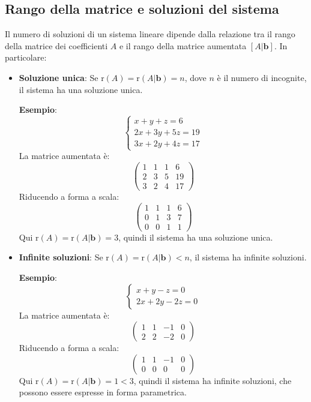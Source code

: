 \documentclass{article}
\begin{document}
\subsection{Rango della matrice e soluzioni del sistema}

Il numero di soluzioni di un sistema lineare dipende dalla relazione tra il
rango della matrice dei coefficienti \( A \) e il rango della matrice aumentata
\( [A | \mathbf{b}] \). In particolare:
\begin{itemize}
	\item \textbf{Soluzione unica}: Se \( \text{r}(A) = \text{r}(A | \mathbf{b}) = n \), dove \( n \) è il numero di incognite, il sistema ha una soluzione unica.

	      \textbf{Esempio}:
	      \[
		      \begin{cases}
			      x + y + z = 6     \\
			      2x + 3y + 5z = 19 \\
			      3x + 2y + 4z = 17
		      \end{cases}
	      \]
	      La matrice aumentata è:
	      \[
		      \left( \begin{array}{ccc|c}
				      1 & 1 & 1 & 6  \\
				      2 & 3 & 5 & 19 \\
				      3 & 2 & 4 & 17
			      \end{array} \right)
	      \]
	      Riducendo a forma a scala:
	      \[
		      \left( \begin{array}{ccc|c}
				      1 & 1 & 1 & 6 \\
				      0 & 1 & 3 & 7 \\
				      0 & 0 & 1 & 1
			      \end{array} \right)
	      \]
	      Qui \( \text{r}(A) = \text{r}(A | \mathbf{b}) = 3 \), quindi il sistema ha una
	      soluzione unica.

	\item \textbf{Infinite soluzioni}: Se \( \text{r}(A) = \text{r}(A | \mathbf{b}) < n \), il sistema ha infinite soluzioni.

	      \textbf{Esempio}:
	      \[
		      \begin{cases}
			      x + y - z = 0 \\
			      2x + 2y - 2z = 0
		      \end{cases}
	      \]
	      La matrice aumentata è:
	      \[
		      \left( \begin{array}{ccc|c}
				      1 & 1 & -1 & 0 \\
				      2 & 2 & -2 & 0
			      \end{array} \right)
	      \]
	      Riducendo a forma a scala:
	      \[
		      \left( \begin{array}{ccc|c}
				      1 & 1 & -1 & 0 \\
				      0 & 0 & 0  & 0
			      \end{array} \right)
	      \]
	      Qui \( \text{r}(A) = \text{r}(A | \mathbf{b}) = 1 < 3 \), quindi il sistema ha
	      infinite soluzioni, che possono essere espresse in forma parametrica.


\end{itemize}
\end{document}
